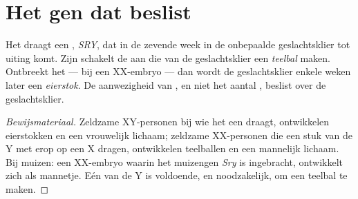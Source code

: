 \section{Het gen dat beslist}

\begin{proposition}\label{prop:g11:becoming-male-female:sry}
Het  draagt een , \emph{SRY}, dat in de
zevende week in de onbepaalde geslachtsklier tot uiting komt. Zijn 
schakelt de  aan die van de geslachtsklier een \emph{teelbal} maken.
Ontbreekt het --- bij een XX-embryo --- dan wordt de geslachtsklier enkele
weken later een \emph{eierstok}. De aanwezigheid van , en niet het
aantal , beslist over de geslachtsklier.
\end{proposition}
\begin{proof}[Bewijsmateriaal]
Zeldzame XY-personen bij wie het  een  draagt, ontwikkelen
eierstokken en een vrouwelijk lichaam; zeldzame XX-personen die een stuk
van de Y met  erop op een X dragen, ontwikkelen teelballen en een
mannelijk lichaam. Bij muizen: een XX-embryo waarin het muizengen
\emph{Sry} is ingebracht, ontwikkelt zich als mannetje. Eén  van de Y
is voldoende, en noodzakelijk, om een teelbal te maken.
\end{proof}


